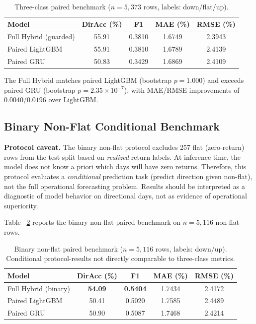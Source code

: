 \documentclass[runningheads]{llncs}
\begin{document}
\begin{table}[htbp]
\centering
\caption{Three-class paired benchmark ($n=5,373$ rows, labels: down/flat/up).}
\label{tabv5-paired-benchmark}
\begin{tabular}{lcccc}
\toprule
Model & DirAcc (\%) & F1 & MAE (\%) & RMSE (\%) \\
\midrule
Full Hybrid (guarded) & 55.91 & 0.3810 & 1.6749 & 2.3943 \\
Paired LightGBM & 55.91 & 0.3810 & 1.6789 & 2.4139 \\
Paired GRU & 50.83 & 0.3429 & 1.6869 & 2.4109 \\
\bottomrule
\end{tabular}
\end{table}

The Full Hybrid matches paired LightGBM (bootstrap $p = 1.000$) and exceeds paired GRU (bootstrap $p = 2.35 \times 10^{-7}$), with MAE/RMSE improvements of $0.0040$/$0.0196$ over LightGBM.

\subsection{Binary Non-Flat Conditional Benchmark}
\label{secv7-binary}

\textbf{Protocol caveat.}
The binary non-flat protocol excludes 257 flat (zero-return) rows from the test split based on \textit{realized} return labels. At inference time, the model does not know a priori which days will have zero returns. Therefore, this protocol evaluates a \emph{conditional} prediction task (predict direction given non-flat), not the full operational forecasting problem. Results should be interpreted as a diagnostic of model behavior on directional days, not as evidence of operational superiority.

Table~
\ref{tabv7-binary-paired-benchmark} reports the binary non-flat paired benchmark on $n=5,116$ non-flat rows.

\begin{table}[htbp]
\centering
\caption{Binary non-flat paired benchmark ($n=5,116$ rows, labels: down/up). Conditional protocol-results not directly comparable to three-class metrics.}
\label{tabv7-binary-paired-benchmark}
\begin{tabular}{lcccc}
\toprule
Model & DirAcc (\%) & F1 & MAE (\%) & RMSE (\%) \\
\midrule
Full Hybrid (binary) & \textbf{54.09} & \textbf{0.5404} & 1.7434 & 2.4172 \\
Paired LightGBM & 50.41 & 0.5020 & 1.7585 & 2.4489 \\
Paired GRU & 50.90 & 0.5087 & 1.7468 & 2.4214 \\
\bottomrule
\end{tabular}
\end{table}
\end{document}
